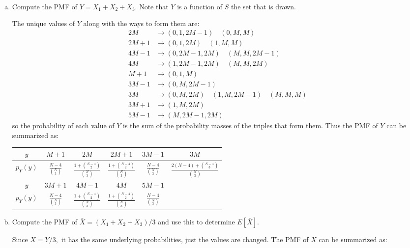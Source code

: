\documentclass{article}
\begin{document}
\begin{enumerate}
\begin{enumerate}[(a)]
\begin{soln}
				\end{soln}

			\item Compute the PMF of $Y=X_1+X_2+X_3.$ Note that $Y$ is a function of $S$ the set that is drawn.
				\begin{soln}
					The unique values of $Y$ along with the ways to form them are:
					\begin{align*}
						2M &\to (0, 1, 2M-1)\quad(0, M, M) \\
						2M+1 &\to (0, 1, 2M)\quad(1, M, M) \\
						4M-1 &\to (0, 2M-1, 2M)\quad(M, M, 2M-1) \\
						4M &\to (1, 2M-1, 2M)\quad(M, M, 2M) \\
						M+1 &\to (0, 1, M) \\
						3M-1 &\to (0, M, 2M-1) \\
						3M &\to (0, M, 2M)\quad(1, M, 2M-1)\quad(M, M, M) \\
						3M+1 &\to (1, M, 2M) \\
						5M-1 &\to (M, 2M-1, 2M)
					\end{align*}
					so the probability of each value of $Y$ is the sum of the probability masses of the triples that form them. Thus the PMF of $Y$ can be summarized as:

					\begin{center}
						\begin{tabular}{c||c|c|c|c|c}
							$y$ & $M+1$ & $2M$ & $2M+1$ & $3M-1$ & $3M$ \\
							\hline
							$p_Y(y)$ & $\displaystyle\frac{N-4}{\binom{N}{3}}$ & $\displaystyle\frac{1+\binom{N-4}{2}}{\binom{N}{3}}$ & $\displaystyle\frac{1+\binom{N-4}{2}}{\binom{N}{3}}$ & $\displaystyle\frac{N-4}{\binom{N}{3}}$ & $\displaystyle\frac{2(N-4)+\binom{N-4}{3}}{\binom{N}{3}}$ \\
							\hline
							$y$ & $3M+1$ & $4M-1$ & $4M$ & $5M-1$ & \\
							\hline
							 $p_Y(y)$ & $\displaystyle\frac{N-4}{\binom{N}{3}}$ & $\displaystyle\frac{1+\binom{N-4}{2}}{\binom{N}{3}}$ & $\displaystyle\frac{1+\binom{N-4}{2}}{\binom{N}{3}}$ & $\displaystyle\frac{N-4}{\binom{N}{3}}$ & 
						\end{tabular}
					\end{center}

				\end{soln}

			\item Compute the PMF of $\bar{X}=(X_1+X_2+X_3)/3$ and use this to determine $E[\bar{X}].$
				\begin{soln}
					Since $\bar{X}=Y/3,$ it has the same underlying probabilities, just the values are changed. The PMF of $\bar{X}$ can be summarized as:


\end{soln}
\end{enumerate}
\end{enumerate}
\end{document}
